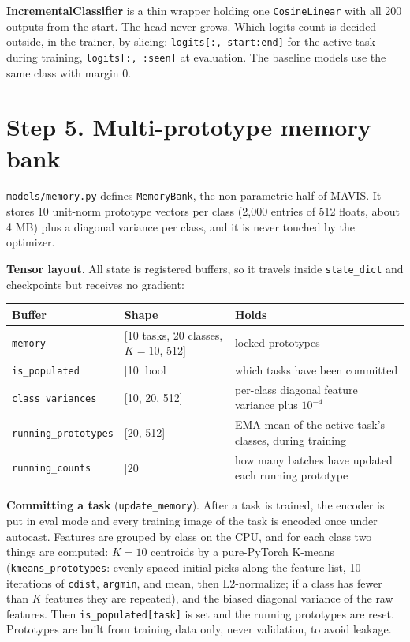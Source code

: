 \documentclass[11pt,a4paper]{article}
\newcommand{\code}[1]{\texttt{#1}}
\begin{document}
\textbf{IncrementalClassifier} is a thin wrapper holding one \code{CosineLinear} with all 200 outputs from the start. The head never grows. Which logits count is decided outside, in the trainer, by slicing: \code{logits[:, start:end]} for the active task during training, \code{logits[:, :seen]} at evaluation. The baseline models use the same class with margin 0.

\section{Step 5. Multi-prototype memory bank}

\code{models/memory.py} defines \code{MemoryBank}, the non-parametric half of MAVIS. It stores 10 unit-norm prototype vectors per class (2{,}000 entries of 512 floats, about 4 MB) plus a diagonal variance per class, and it is never touched by the optimizer.

\textbf{Tensor layout}. All state is registered buffers, so it travels inside \code{state\_dict} and checkpoints but receives no gradient:

\begin{tabularx}{\textwidth}{L{3.6cm} L{5cm} Y}
\toprule
Buffer & Shape & Holds \\
\midrule
\code{memory} & [10 tasks, 20 classes, $K{=}10$, 512] & locked prototypes \\
\code{is\_populated} & [10] bool & which tasks have been committed \\
\code{class\_variances} & [10, 20, 512] & per-class diagonal feature variance plus $10^{-4}$ \\
\code{running\_prototypes} & [20, 512] & EMA mean of the active task's classes, during training \\
\code{running\_counts} & [20] & how many batches have updated each running prototype \\
\bottomrule
\end{tabularx}

\textbf{Committing a task} (\code{update\_memory}). After a task is trained, the encoder is put in eval mode and every training image of the task is encoded once under autocast. Features are grouped by class on the CPU, and for each class two things are computed: $K = 10$ centroids by a pure-PyTorch K-means (\code{kmeans\_prototypes}: evenly spaced initial picks along the feature list, 10 iterations of \code{cdist}, \code{argmin}, and mean, then L2-normalize; if a class has fewer than $K$ features they are repeated), and the biased diagonal variance of the raw features. Then \code{is\_populated[task]} is set and the running prototypes are reset. Prototypes are built from training data only, never validation, to avoid leakage.
\end{document}
